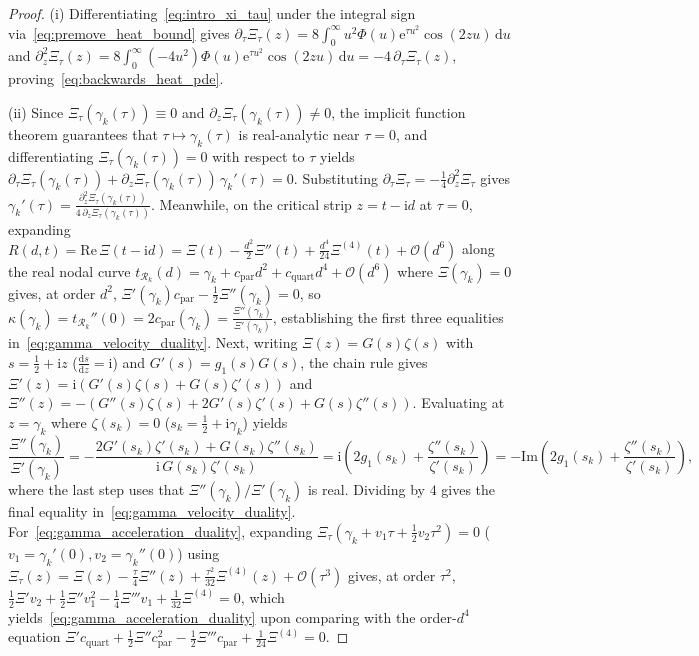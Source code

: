 \documentclass[11pt,reqno]{amsart}
\theoremstyle{definition}
\theoremstyle{remark}
\numberwithin{equation}{section}
\newcommand{\dd}{\mathrm{d}}
\newcommand{\ee}{\mathrm{e}}
\newcommand{\ii}{\mathrm{i}}
\newcommand{\Rea}{\mathrm{Re}}
\newcommand{\Ima}{\mathrm{Im}}
\begin{document}
\begin{proof}
(i) Differentiating~\eqref{eq:intro_xi_tau} under the integral sign via~\eqref{eq:premove_heat_bound} gives $\partial_\tau\Xi_\tau(z) = 8\int_0^\infty u^2\Phi(u)\ee^{\tau u^2}\cos(2zu)\,\dd u$ and $\partial_z^2\Xi_\tau(z) = 8\int_0^\infty (-4u^2)\Phi(u)\ee^{\tau u^2}\cos(2zu)\,\dd u = -4\,\partial_\tau\Xi_\tau(z)$, proving~\eqref{eq:backwards_heat_pde}.

(ii) Since $\Xi_\tau(\gamma_k(\tau)) \equiv 0$ and $\partial_z\Xi_\tau(\gamma_k(\tau)) \neq 0$, the implicit function theorem guarantees that $\tau \mapsto \gamma_k(\tau)$ is real-analytic near $\tau = 0$, and differentiating $\Xi_\tau(\gamma_k(\tau)) = 0$ with respect to $\tau$ yields $\partial_\tau\Xi_\tau(\gamma_k(\tau)) + \partial_z\Xi_\tau(\gamma_k(\tau))\,\gamma_k'(\tau) = 0$. Substituting $\partial_\tau\Xi_\tau = -\frac{1}{4}\partial_z^2\Xi_\tau$ gives $\gamma_k'(\tau) = \frac{\partial_z^2\Xi_\tau(\gamma_k(\tau))}{4\,\partial_z\Xi_\tau(\gamma_k(\tau))}$. Meanwhile, on the critical strip $z = t - \ii d$ at $\tau = 0$, expanding $R(d,t) = \Rea\,\Xi(t-\ii d) = \Xi(t) - \frac{d^2}{2}\Xi''(t) + \frac{d^4}{24}\Xi^{(4)}(t) + \mathcal{O}(d^6)$ along the real nodal curve $t_{\mathcal{R}_k}(d) = \gamma_k + c_{\mathrm{par}}d^2 + c_{\mathrm{quart}}d^4 + \mathcal{O}(d^6)$ where $\Xi(\gamma_k) = 0$ gives, at order $d^2$, $\Xi'(\gamma_k)c_{\mathrm{par}} - \frac{1}{2}\Xi''(\gamma_k) = 0$, so $\kappa(\gamma_k) = t_{\mathcal{R}_k}''(0) = 2c_{\mathrm{par}}(\gamma_k) = \frac{\Xi''(\gamma_k)}{\Xi'(\gamma_k)}$, establishing the first three equalities in~\eqref{eq:gamma_velocity_duality}. Next, writing $\Xi(z) = G(s)\zeta(s)$ with $s = \frac{1}{2} + \ii z$ ($\frac{\dd s}{\dd z} = \ii$) and $G'(s) = g_1(s)G(s)$, the chain rule gives $\Xi'(z) = \ii(G'(s)\zeta(s) + G(s)\zeta'(s))$ and $\Xi''(z) = -(G''(s)\zeta(s) + 2G'(s)\zeta'(s) + G(s)\zeta''(s))$. Evaluating at $z = \gamma_k$ where $\zeta(s_k) = 0$ ($s_k = \frac{1}{2}+\ii\gamma_k$) yields
\[
\frac{\Xi''(\gamma_k)}{\Xi'(\gamma_k)} = -\frac{2G'(s_k)\zeta'(s_k) + G(s_k)\zeta''(s_k)}{\ii\,G(s_k)\zeta'(s_k)} = \ii\!\left(2g_1(s_k) + \frac{\zeta''(s_k)}{\zeta'(s_k)}\right) = -\Ima\!\left(2g_1(s_k) + \frac{\zeta''(s_k)}{\zeta'(s_k)}\right),
\]
where the last step uses that $\Xi''(\gamma_k)/\Xi'(\gamma_k)$ is real. Dividing by $4$ gives the final equality in~\eqref{eq:gamma_velocity_duality}. For~\eqref{eq:gamma_acceleration_duality}, expanding $\Xi_\tau(\gamma_k + v_1\tau + \frac{1}{2}v_2\tau^2) = 0$ ($v_1 = \gamma_k'(0), v_2 = \gamma_k''(0)$) using $\Xi_\tau(z) = \Xi(z) - \frac{\tau}{4}\Xi''(z) + \frac{\tau^2}{32}\Xi^{(4)}(z) + \mathcal{O}(\tau^3)$ gives, at order $\tau^2$, $\frac{1}{2}\Xi' v_2 + \frac{1}{2}\Xi'' v_1^2 - \frac{1}{4}\Xi''' v_1 + \frac{1}{32}\Xi^{(4)} = 0$, which yields~\eqref{eq:gamma_acceleration_duality} upon comparing with the order-$d^4$ equation $\Xi' c_{\mathrm{quart}} + \frac{1}{2}\Xi'' c_{\mathrm{par}}^2 - \frac{1}{2}\Xi''' c_{\mathrm{par}} + \frac{1}{24}\Xi^{(4)} = 0$.


\end{proof}
\end{document}
